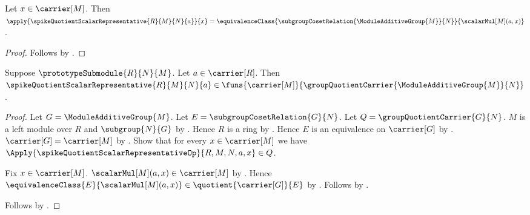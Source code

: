 \begin{proposition}\label{spike_quotient_scalar_representative_apply}
    Let $x\in\carrier[M]$.
    Then
        $\apply{\spikeQuotientScalarRepresentative{R}{M}{N}{a}}{x}
            =\equivalenceClass{
                \subgroupCosetRelation{\ModuleAdditiveGroup{M}}{N}}
                {\scalarMul[M](a,x)}$.
\end{proposition}
\begin{proof}
    Follows by
        .
\end{proof}

\begin{proposition}\label{spike_quotient_scalar_representative_type}
    Suppose $\prototypeSubmodule{R}{N}{M}$.
    Let $a\in\carrier[R]$.
    Then
        $\spikeQuotientScalarRepresentative{R}{M}{N}{a}
            \in\funs{\carrier[M]}{
                \groupQuotientCarrier{\ModuleAdditiveGroup{M}}{N}}$.
\end{proposition}
\begin{proof}
    Let $G=\ModuleAdditiveGroup{M}$.
    Let $E=\subgroupCosetRelation{G}{N}$.
    Let $Q=\groupQuotientCarrier{G}{N}$.
    $M$ is a left module over $R$ and $\subgroup{N}{G}$ by
        .
    Hence $R$ is a ring by .
    Hence $E$ is an equivalence on $\carrier[G]$ by
        .
    $\carrier[G]=\carrier[M]$ by
        .
    Show that for every $x\in\carrier[M]$ we have
        $\Apply{\spikeQuotientScalarRepresentativeOp}{R,M,N,a,x}\in Q$.
    \begin{subproof}
        Fix $x\in\carrier[M]$.
        $\scalarMul[M](a,x)\in\carrier[M]$ by
            .
        Hence
            $\equivalenceClass{E}{\scalarMul[M](a,x)}
                \in\quotient{\carrier[G]}{E}$ by
            .
        Follows by
            .
    \end{subproof}
    Follows by
        .
\end{proof}

